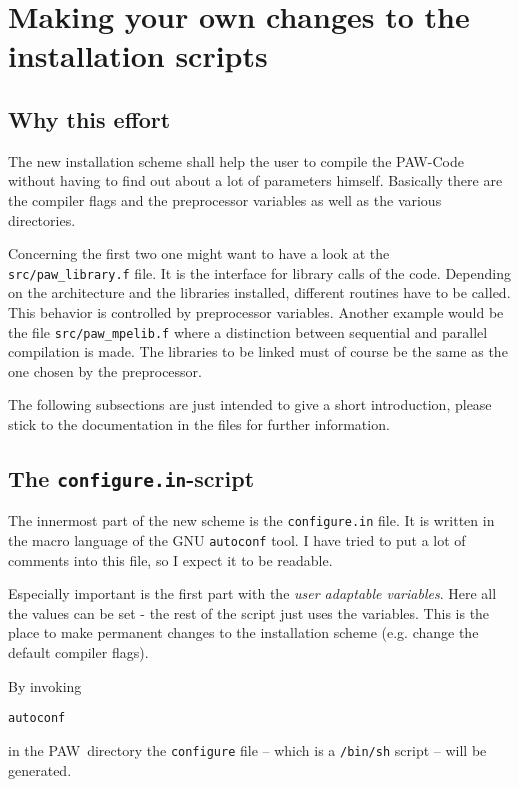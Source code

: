 \documentclass[a4paper,10pt]{article}
\newcommand{\PAW}{\textsc{PAW}}
\begin{document}
\section{Making your own changes to the installation scripts}
\label{sec:hack}

\subsection{Why this effort}

The new installation scheme shall help the user to compile the \PAW-Code
without having to find out about a lot of parameters himself.  Basically there
are the compiler flags and the preprocessor variables as well as the various
directories.  

Concerning the first two one might want to have a look at the
\texttt{src/paw\_library.f} file.  It is the interface for library calls of the
code.  Depending on the architecture and the libraries installed, different
routines have to be called.  This behavior is controlled by preprocessor
variables.  Another example would be the file \texttt{src/paw\_mpelib.f} where
a distinction between sequential and parallel compilation is made.  The
libraries to be linked must of course be the same as the one chosen by the
preprocessor.

The following subsections are just intended to give a short introduction, please stick to the documentation in the files for further information.

\subsection{The \texttt{configure.in}-script}

The innermost part of the new scheme is the \texttt{configure.in} file.  It is
written in the macro language of the GNU \texttt{autoconf} tool.  I have tried
to put a lot of comments into this file, so I expect it to be readable.

Especially important is the first part with the \emph{user adaptable
variables}. Here all the values can be set - the rest of the script just uses
the variables.  This is the place to make permanent changes to the installation
scheme (e.g. change the default compiler flags).

By invoking
\begin{verbatim}
autoconf
\end{verbatim}
in the \PAW\ directory the \texttt{configure} file -- which is a \texttt{/bin/sh} script -- will be generated.
\end{document}
